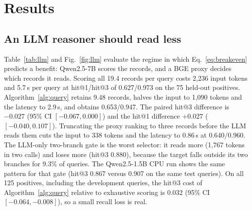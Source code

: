 \documentclass{ieeeaccess}
\begin{document}
\section{Results}
\label{sec:results}

\subsection{An LLM reasoner should read less}
\label{sec:llm}
Table~\ref{tab:llm} and Fig.~\ref{fig:llm} evaluate the regime in which
Eq.~\eqref{eq:breakeven} predicts a benefit: Qwen2.5-7B scores the records, and a
BGE proxy decides which records it reads. Scoring all 19.4 records per query costs
2,236 input tokens and 5.7\,s per query at hit@1/hit@3 of 0.627/0.973 on the 75
held-out positives. Algorithm~\ref{alg:query} retains 9.48 records, halves the
input to 1,090 tokens and the latency to 2.9\,s, and obtains 0.653/0.947. The
paired hit@3 difference is $-0.027$ (95\% CI $[-0.067,0.000]$) and the hit@1
difference $+0.027$ ($[-0.040,0.107]$). Truncating the proxy ranking to three
records before the LLM reads them cuts the input to 338 tokens and the latency to
0.86\,s at 0.640/0.960. The LLM-only two-branch gate is the worst selector: it
reads more (1,767 tokens in two calls) and loses more (hit@3 0.880), because the
target falls outside its two branches for 9.3\% of queries. The Qwen2.5-1.5B CPU run shows the same pattern for that gate (hit@3 0.867
versus 0.907 on the same test queries). On all 125 positives, including the
development queries, the hit@3 cost of Algorithm~\ref{alg:query} relative to
exhaustive scoring is 0.032 (95\% CI $[-0.064,-0.008]$), so a small recall loss
is real.
\end{document}
